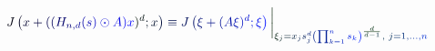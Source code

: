 \documentclass[12pt]{article}
\begin{document}
\makeatletter
\renewcommand*{\@textcolor}[3]{%
  \protect\leavevmode
  \begingroup
    \color#1{#2}#3%
  \endgroup
}
\makeatother
\begin{displaymath}
\mathcolor[RGB]{0,0,15}{J} \mathcolor[RGB]{0,0,30}{\left(} \mathcolor[RGB]{0,0,45}{x} \mathcolor[RGB]{0,0,60}{+} \mathcolor[RGB]{0,0,75}{(} \mathcolor[RGB]{0,0,90}{(} \mathcolor[RGB]{0,0,105}{H} _ { \mathcolor[RGB]{0,0,120}{n} \mathcolor[RGB]{0,0,135}{,} \mathcolor[RGB]{0,0,150}{d} } \mathcolor[RGB]{0,0,165}{(} \mathcolor[RGB]{0,0,180}{s} \mathcolor[RGB]{0,0,195}{)} \mathcolor[RGB]{0,0,210}{\odot} \mathcolor[RGB]{0,0,225}{A} \mathcolor[RGB]{0,0,240}{)} \mathcolor[RGB]{0,0,255}{x} \mathcolor[RGB]{0,15,0}{)} ^ { \mathcolor[RGB]{0,15,15}{d} } \mathcolor[RGB]{0,15,30}{;} \mathcolor[RGB]{0,15,45}{x} \mathcolor[RGB]{0,15,60}{\right)} \mathcolor[RGB]{0,15,75}{\equiv} \mathcolor[RGB]{0,15,90}{J} \mathcolor[RGB]{0,15,105}{\left(} \mathcolor[RGB]{0,15,120}{\xi} \mathcolor[RGB]{0,15,135}{+} \mathcolor[RGB]{0,15,150}{(} \mathcolor[RGB]{0,15,165}{A} \mathcolor[RGB]{0,15,180}{\xi} \mathcolor[RGB]{0,15,195}{)} ^ { \mathcolor[RGB]{0,15,210}{d} } \mathcolor[RGB]{0,15,225}{;} \mathcolor[RGB]{0,15,240}{\xi} \mathcolor[RGB]{0,15,255}{\right)} \mathcolor[RGB]{0,30,0}{\bigg|} _ { \mathcolor[RGB]{0,30,15}{\xi} _ { \mathcolor[RGB]{0,30,30}{j} } \mathcolor[RGB]{0,30,45}{=} \mathcolor[RGB]{0,30,60}{x} _ { \mathcolor[RGB]{0,30,75}{j} } \mathcolor[RGB]{0,30,90}{s} _ { \mathcolor[RGB]{0,30,105}{j} } ^ { \mathcolor[RGB]{0,30,120}{d} } \mathcolor[RGB]{0,30,135}{\left(} \mathcolor[RGB]{0,30,150}{\prod} _ { \mathcolor[RGB]{0,30,165}{k} \mathcolor[RGB]{0,30,180}{=} \mathcolor[RGB]{0,30,195}{1} } ^ { \mathcolor[RGB]{0,30,210}{n} } \mathcolor[RGB]{0,30,225}{s} _ { \mathcolor[RGB]{0,30,240}{k} } \mathcolor[RGB]{0,30,255}{\right)} ^ { \mathcolor[RGB]{0,45,0}{\frac { \mathcolor[RGB]{0,45,15}{d} } { \mathcolor[RGB]{0,45,30}{d} \mathcolor[RGB]{0,45,45}{-} \mathcolor[RGB]{0,45,60}{1} } } } \mathcolor[RGB]{0,45,75}{,} \, \, \mathcolor[RGB]{0,45,90}{j} \mathcolor[RGB]{0,45,105}{=} \mathcolor[RGB]{0,45,120}{1} \mathcolor[RGB]{0,45,135}{,} \mathcolor[RGB]{0,45,150}{.} \mathcolor[RGB]{0,45,165}{.} \mathcolor[RGB]{0,45,180}{.} \mathcolor[RGB]{0,45,195}{,} \mathcolor[RGB]{0,45,210}{n} }
\end{displaymath}
\end{document}
